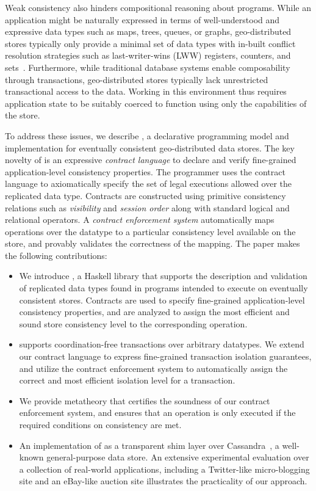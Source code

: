 Weak consistency also hinders compositional reasoning about programs.  While
an application might be naturally expressed in terms of well-understood and
expressive data types such as maps, trees, queues, or graphs,
geo-distributed stores typically only provide a minimal set of data types
with in-built conflict resolution strategies such as last-writer-wins (LWW)
registers, counters, and sets~\cite{Cassandra,DynamoDB}.  Furthermore, while
traditional database systems enable composability through transactions,
geo-distributed stores typically lack unrestricted transactional access to
the data.  Working in this environment thus requires application state to be
suitably coerced to function using only the capabilities of the store.

To address these issues, we describe \name, a declarative programming model
and implementation for eventually consistent geo-distributed data
stores. The key novelty of \name is an expressive \emph{contract language}
to declare and verify fine-grained application-level consistency
properties. The programmer uses the contract language to axiomatically
specify the set of legal executions allowed over the replicated data
type. Contracts are constructed using primitive consistency relations such
as \emph{visibility} and \emph{session order} along with standard logical
and relational operators. A \emph{contract enforcement system} automatically
maps operations over the datatype to a particular consistency level
available on the store, and provably validates the correctness of the
mapping.  The paper makes the following contributions:

\begin{itemize}
\setlength{\itemsep}{2pt}
\item We introduce \name, a Haskell library that supports the description
  and validation of replicated data types found in programs intended to
  execute on eventually consistent stores. Contracts are used to specify
  fine-grained application-level consistency properties, and are analyzed to
  assign the most efficient and sound store consistency level to the
  corresponding operation.
\item \name supports coordination-free transactions over arbitrary datatypes.
	We extend our contract language to express fine-grained transaction isolation
	guarantees, and utilize the contract enforcement system to automatically
	assign the correct and most efficient isolation level for a transaction.
\item We provide metatheory that certifies the soundness of our contract
	enforcement system, and ensures that an operation is only executed if the
	required conditions on consistency are met.
\item An implementation of \name as a transparent shim layer over
	Cassandra~\cite{Cassandra}, a well-known general-purpose data store.  An
	extensive experimental evaluation over a collection of real-world
	applications, including a Twitter-like micro-blogging site and an eBay-like
	auction site illustrates the practicality of our approach.
\end{itemize}

